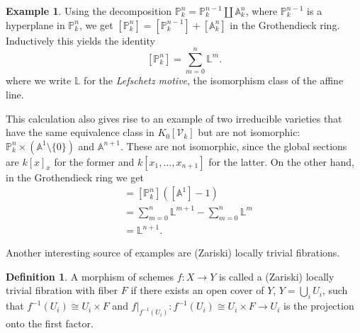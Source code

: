 \documentclass[11pt, a4paper, english, twoside]{article}
\theoremstyle{plain}
\theoremstyle{definition}
\newtheorem{definition}[theorem]{Definition}
\newtheorem{example}[theorem]{Example}
\newcommand{\gring}[1][k]{K_0[\mathcal{V}_#1]}
\begin{document}
\begin{example}
    \label{projSum}
    Using the decomposition $\mathbb{P}_k^n = \mathbb{P}_k^{n-1} \coprod \mathbb{A}_k^n$, where $\mathbb{P}_k^{n-1}$ is a hyperplane
    in $\mathbb{P}_k^n$, we get $[\mathbb{P}_k^n] = [\mathbb{P}_k^{n-1}] + [\mathbb{A}_k^n]$ in the Grothendieck ring.
    Inductively this yields the identity 
    \[
        [\mathbb{P}_k^n] = \sum_{m=0}^n \mathbb{L}^m.
    \]
    where we write $\mathbb{L}$ for the \emph{Lefschetz motive}, the isomorphism class of the affine line.
\end{example}

This calculation also gives rise to an example of two irreducible varieties that have the same equivalence class in $\gring[k]$ but are not
isomorphic: $\mathbb{P}_k^n \times (\mathbb{A}^1\setminus \{0\})$ and $\mathbb{A}^{n+1}$. These are not isomorphic, since the global sections 
are $k[x]_{x}$ for the former and $k[x_1,\dots,x_{n+1}]$ for the latter. On the other hand, in the Grothendieck ring we get
\begin{align*}
    [\mathbb{P}_k^n \times \left (\mathbb{A}^1 \setminus \{0\}\right )] &= [\mathbb{P}_k^n]\left ([\mathbb{A}^1] - 1\right ) \\
                                                                      &= \sum_{m=0}^n \mathbb{L}^{m+1} - \sum_{m=0}^n \mathbb{L}^m \\
                                                                      &= \mathbb{L}^{n+1}.
\end{align*}

Another interesting source of examples are (Zariski) locally trivial fibrations.
\begin{definition}
    A morphism of schemes $f \colon X \to Y$ is called a (Zariski) locally trivial fibration with fiber $F$ if there exists an open cover of $Y$,
    $Y = \bigcup_{i} U_i$, such that $f^{-1}(U_i) \cong U_i \times F$ and $f|_{f^{-1}(U_i)} \colon f^{-1}(U_i) \cong U_i \times F \to U_i$ is
    the projection onto the first factor.
\end{definition}
\end{document}

